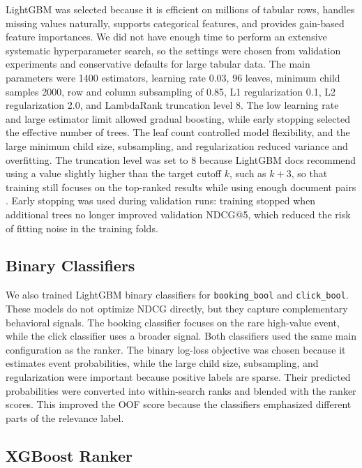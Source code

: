 \documentclass[runningheads]{llncs}
\begin{document}
LightGBM was selected because it is efficient on millions of tabular rows, handles missing values naturally, supports categorical features, and provides gain-based feature importances.  We did not have enough time to perform an extensive systematic hyperparameter search, so the settings were chosen from validation experiments and conservative defaults for large tabular data.  The main parameters were 1400 estimators, learning rate 0.03, 96 leaves, minimum child samples 2000, row and column subsampling of 0.85, L1 regularization 0.1, L2 regularization 2.0, and LambdaRank truncation level 8.  The low learning rate and large estimator limit allowed gradual boosting, while early stopping selected the effective number of trees.  The leaf count controlled model flexibility, and the large minimum child size, subsampling, and regularization reduced variance and overfitting.  The truncation level was set to 8 because LightGBM docs recommend using a value slightly higher than the target cutoff $k$, such as $k+3$, so that training still focuses on the top-ranked results while using enough document pairs \cite{lightgbmparams}.  Early stopping was used during validation runs: training stopped when additional trees no longer improved validation NDCG@5, which reduced the risk of fitting noise in the training folds.

\subsection{Binary Classifiers}

We also trained LightGBM binary classifiers for \texttt{booking\_bool} and \texttt{click\_bool}.  These models do not optimize NDCG directly, but they capture complementary behavioral signals.  The booking classifier focuses on the rare high-value event, while the click classifier uses a broader signal.  Both classifiers used the same main configuration as the ranker. The binary log-loss objective was chosen because it estimates event probabilities, while the large child size, subsampling, and regularization were important because positive labels are sparse.  Their predicted probabilities were converted into within-search ranks and blended with the ranker scores.  This improved the OOF score because the classifiers emphasized different parts of the relevance label.

\subsection{XGBoost Ranker}
\end{document}
